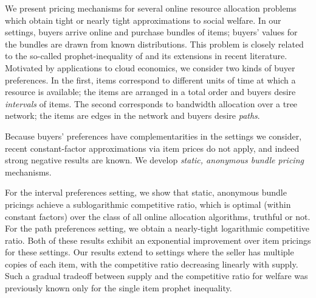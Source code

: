 We present pricing mechanisms for several online resource allocation
problems which obtain tight or nearly tight approximations to social
welfare. In our settings, buyers arrive online and purchase bundles of
items; buyers' values for the bundles are drawn from known
distributions. This problem is closely related to the so-called
prophet-inequality of \citet{KS-78} and its extensions in recent
literature. Motivated by applications to cloud economics, we consider
two kinds of buyer preferences. In the first, items correspond to
different units of time at which a resource is available; the items
are arranged in a total order and buyers desire {\em intervals} of
items. The second corresponds to bandwidth allocation over a tree
network; the items are edges in the network and buyers desire {\em
paths}.





Because buyers' preferences have complementarities in the settings we
consider, recent constant-factor approximations via item prices do not
apply, and indeed strong negative results are known. We develop
{\em static, anonymous bundle pricing} mechanisms.


For the interval preferences setting, we show that static, anonymous
bundle pricings achieve a sublogarithmic competitive ratio, which is
optimal (within constant factors) over the class of all online
allocation algorithms, truthful or not. For the path preferences
setting, we obtain a nearly-tight logarithmic competitive ratio. Both
of these results exhibit an exponential improvement over item pricings
for these settings. Our results extend to settings where the seller
has multiple copies of each item, with the competitive ratio
decreasing linearly with supply. Such a gradual tradeoff between
supply and the competitive ratio for welfare was previously known only
for the single item prophet inequality.





